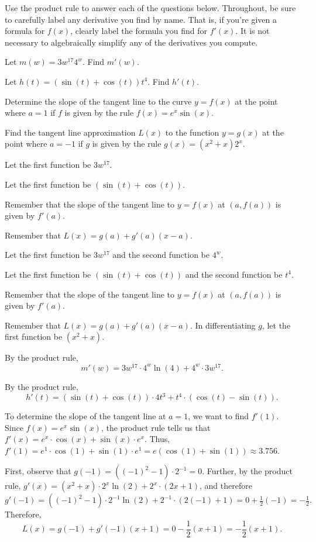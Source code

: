 \begin{activity} \label{A:2.3.1}  Use the product rule to answer each of the questions below.  Throughout, be sure to carefully label any derivative you find by name.  That is, if you're given a formula for $f(x)$, clearly label the formula you find for $f'(x)$.  It is not necessary to algebraically simplify any of the derivatives you compute.
\ba
	\item Let $m(w)=3w^{17} 4^w$.  Find $m'(w)$.
	\item Let $h(t) = (\sin(t) + \cos(t))t^4$.  Find $h'(t)$.
	\item Determine the slope of the tangent line to the curve $y = f(x)$ at the point where $a = 1$ if $f$ is given by the rule $f(x) = e^x \sin(x)$.
	\item Find the tangent line approximation $L(x)$ to the function $y = g(x)$ at the point where $a = -1$ if $g$ is given by the rule $g(x) = (x^2 + x) 2^x$.
\ea

\end{activity}
\begin{smallhint}
\ba
	\item Let the first function be $3w^{17}$.
	\item Let the first function be $(\sin(t) + \cos(t))$.
	\item Remember that the slope of the tangent line to $y = f(x)$ at $(a,f(a))$ is given by $f'(a)$.
	\item Remember that $L(x) = g(a) + g'(a)(x-a).$
\ea
\end{smallhint}
\begin{bighint}
\ba
	\item Let the first function be $3w^{17}$ and the second function be $4^w$.
	\item Let the first function be $(\sin(t) + \cos(t))$ and the second function be $t^4$.
	\item Remember that the slope of the tangent line to $y = f(x)$ at $(a,f(a))$ is given by $f'(a)$.
	\item Remember that $L(x) = g(a) + g'(a)(x-a).$  In differentiating $g$, let the first function be $(x^2 + x)$.
\ea
\end{bighint}
\begin{activitySolution}
\ba
	\item By the product rule, 
	$$m'(w) = 3w^{17} \cdot 4^w \ln(4) + 4^w \cdot 3w^17.$$ 
	\item By the product rule, 
	$$h'(t) = (\sin(t) + \cos(t)) \cdot 4t^3 + t^4 \cdot (\cos(t) - \sin(t)).$$ 
	\item To determine the slope of the tangent line at $a = 1$, we want to find $f'(1)$.  Since $f(x) = e^x \sin(x)$, the product rule tells us that $f'(x) = e^x \cdot \cos(x) + \sin(x) \cdot e^x$.  Thus, $f'(1) = e^1 \cdot \cos(1) + \sin(1) \cdot e^1 = e(\cos(1) + \sin(1)) \approx 3.756$.
	\item First, observe that $g(-1) = ((-1)^2 - 1) \cdot 2^{-1} = 0$.  Further, by the product rule, $g'(x) = (x^2 + x) \cdot 2^x \ln(2) + 2^x \cdot (2x + 1)$, and therefore $g'(-1) = ((-1)^2 - 1) \cdot 2^{-1} \ln(2) + 2^{-1} \cdot (2(-1) + 1) = 0 + \frac{1}{2}(-1) = -\frac{1}{2}.$  Therefore,
	$$L(x) = g(-1) + g'(-1)(x+1) = 0 - \frac{1}{2}(x+1) = -\frac{1}{2}(x+1).$$
\ea
\end{activitySolution}
\aftera